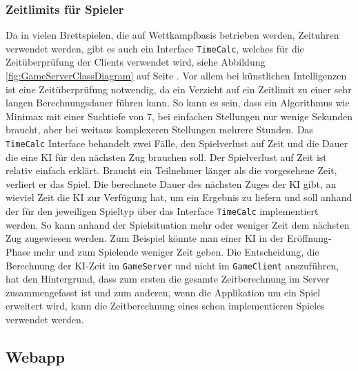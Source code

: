 \documentclass[12pt,a4paper,bibliography=totocnumbered,listof=totocnumbered]{article}
\begin{document}
\subsubsection{Zeitlimits für Spieler}
\label{chap:timelimit}
Da in vielen Brettspielen, die auf Wettkampfbasis betrieben werden, Zeituhren verwendet werden, gibt es auch ein Interface \texttt{TimeCalc}, welches
für die Zeitüberprüfung der Clients verwendet wird, siehe Abbildung \ref{fig:GameServerClassDiagram} auf Seite \pageref{fig:GameServerClassDiagram}. 
Vor allem bei künstlichen Intelligenzen ist eine Zeitüberprüfung notwendig, da ein Verzicht auf ein 
Zeitlimit zu einer sehr langen Berechnungsdauer führen kann. So kann es sein, dass ein Algorithmus wie Minimax mit einer Suchtiefe von 7, bei einfachen
Stellungen nur wenige Sekunden braucht, aber bei weitaus komplexeren Stellungen mehrere Stunden. 
Das \texttt{TimeCalc} Interface behandelt zwei Fälle, den Spielverlust auf Zeit und die 
Dauer die eine KI für den nächsten Zug brauchen soll. Der Spielverlust auf Zeit ist relativ einfach erklärt. Braucht ein Teilnehmer länger als 
die vorgesehene Zeit, verliert er das Spiel. Die berechnete Dauer des nächsten Zuges der KI gibt, an wieviel Zeit die KI zur Verfügung hat, um ein
Ergebnis zu liefern und soll anhand der für den jeweiligen Spieltyp über das 
Interface \texttt{TimeCalc} implementiert werden. So kann anhand der Spielsituation mehr oder weniger Zeit dem nächsten Zug zugewiesen werden. 
Zum Beispiel könnte man einer KI in der Eröffnung-Phase mehr und zum Spielende weniger Zeit geben. 
Die Entscheidung, die Berechnung der KI-Zeit im \texttt{GameServer} und nicht im \texttt{GameClient} auszuführen, hat den Hintergrund, 
dass zum ersten die gesamte Zeitberechnung im Server zusammengefasst ist und zum anderen, wenn die Applikation um ein Spiel erweitert wird, kann
die Zeitberechnung eines schon implementieren Spieles verwendet werden.

\subsection{Webapp}
\end{document}
